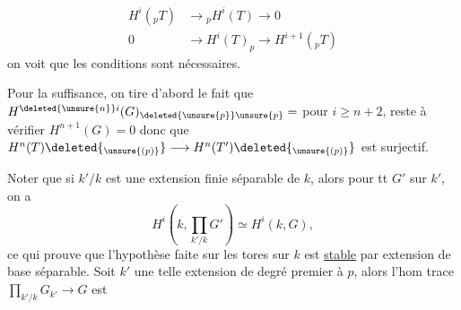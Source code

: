 \[
\begin{aligned}
H^i({}_pT)&\longrightarrow {}_pH^i(T)\longrightarrow 0\\
0&\longrightarrow H^i(T)_p\longrightarrow H^{i+1}({}_pT)
\end{aligned}
\]
on voit que les conditions sont nécessaires.

Pour la suffisance, on tire d'abord le fait que $H^{\deleted{\unsure{n}}i}(G)_{\deleted{\unsure{p}} \unsure{p}}=$ pour $i\geq n+2$, reste à vérifier $H^{n+1}(G)=0$ donc que $H^n(T)\deleted{{}_{\unsure{(p)}}}\longrightarrow H^n(T')\deleted{{}_{\unsure{(p)}}}$ est surjectif. 

Noter que si $k'/k$ est une extension finie séparable de $k$, alors pour tt $G'$ sur $k'$, on a
\[
H^i(k,\prod_{k'/k}G')\simeq H^i(k,G),
\]
ce qui prouve que l'hypothèse faite sur les tores sur $k$ est \uline{stable} par extension de base séparable. Soit $k'$ une telle extension de degré premier à $p$, alors l'hom trace $\prod_{k'/k}G_{k'}\longrightarrow G$ est  

